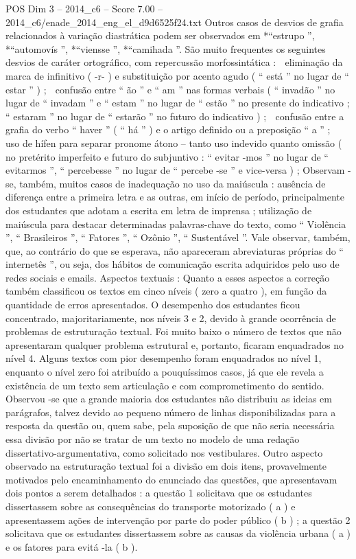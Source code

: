 \begin{textsample}{POS Dim 3 – 2014\_c6 – Score 7.00 – 2014\_c6/enade\_2014\_eng\_el\_d9d6525f24.txt}
Outros casos de desvios de grafia relacionados à variação diastrática podem ser observados em *“estrupo ”, *“automovís ”, *“viensse ”, *“camihada ”.
São muito frequentes os seguintes desvios de caráter ortográfico, com repercussão morfossintática :  eliminação da marca de infinitivo ( -r- ) e substituição por acento agudo ( “ está ” no lugar de “ estar ” ) ;  confusão entre “ ão ” e “ am ” nas formas verbais ( “ invadão ” no lugar de “ invadam ” e “ estam ” no lugar de “ estão ” no presente do indicativo ; “ estaram ” no lugar de “ estarão ” no futuro do indicativo ) ;  confusão entre a grafia do verbo “ haver ” ( “ há ” ) e o artigo definido ou a preposição “ a ” ;  uso de hífen para separar pronome átono – tanto uso indevido quanto omissão ( no pretérito imperfeito e futuro do subjuntivo : “ evitar -mos ” no lugar de “ evitarmos ”, “ percebesse ” no lugar de “ percebe -se ” e vice-versa ) ; Observam -se, também, muitos casos de inadequação no uso da maiúscula : ausência de diferença entre a primeira letra e as outras, em início de período, principalmente dos estudantes que adotam a escrita em letra de imprensa ; utilização de maiúscula para destacar determinadas palavras-chave do texto, como “ Violência ”, “ Brasileiros ”, “ Fatores ”, “ Ozônio ”, “ Sustentável ”.
Vale observar, também, que, ao contrário do que se esperava, não apareceram abreviaturas próprias do “ internetês ”, ou seja, dos hábitos de comunicação escrita adquiridos pelo uso de redes sociais e emails.
Aspectos textuais : Quanto a esses aspectos a correção também classificou os textos em cinco níveis ( zero a quatro ), em função da quantidade de erros apresentados.
O desempenho dos estudantes ficou concentrado, majoritariamente, nos níveis 3 e 2, devido à grande ocorrência de problemas de estruturação textual.
Foi muito baixo o número de textos que não apresentaram qualquer problema estrutural e, portanto, ficaram enquadrados no nível 4.
Alguns textos com pior desempenho foram enquadrados no nível 1, enquanto o nível zero foi atribuído a pouquíssimos casos, já que ele revela a existência de um texto sem articulação e com comprometimento do sentido.
Observou -se que a grande maioria dos estudantes não distribuiu as ideias em parágrafos, talvez devido ao pequeno número de linhas disponibilizadas para a resposta da questão ou, quem sabe, pela suposição de que não seria necessária essa divisão por não se tratar de um texto no modelo de uma redação dissertativo-argumentativa, como solicitado nos vestibulares.
Outro aspecto observado na estruturação textual foi a divisão em dois itens, provavelmente motivados pelo encaminhamento do enunciado das questões, que apresentavam dois pontos a serem detalhados : a questão 1 solicitava que os estudantes dissertassem sobre as consequências do transporte motorizado ( a ) e apresentassem ações de intervenção por parte do poder público ( b ) ; a questão 2 solicitava que os estudantes dissertassem sobre as causas da violência urbana ( a ) e os fatores para evitá -la ( b ).

\end{textsample}
